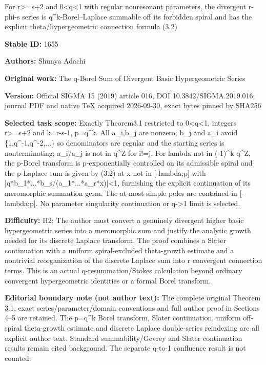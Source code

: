 \documentclass[11pt]{article}
\numberwithin{equation}{section}
\begin{document}
\begin{center}\Large For r>=s+2 and 0<q<1 with regular nonresonant parameters, the divergent r-phi-s series is q\textasciicircum{}k-Borel–Laplace summable off its forbidden spiral and has the explicit theta/hypergeometric connection formula (3.2)\end{center}
\noindent\textbf{Stable ID:} 1655\par
\noindent\textbf{Authors:} Shunya Adachi\par
\noindent\textbf{Original work:} The q-Borel Sum of Divergent Basic Hypergeometric Series\par
\noindent\textbf{Version:} Official SIGMA 15 (2019) article 016, DOI 10.3842/SIGMA.2019.016; journal PDF and native TeX acquired 2026-09-30, exact bytes pinned by SHA256\par
\noindent\textbf{Selected task scope:} Exactly Theorem3.1 restricted to 0<q<1, integers r>=s+2 and k=r-s-1, p=q\textasciicircum{}k. All a\_i,b\_j are nonzero; b\_j and a\_i avoid \{1,q\textasciicircum{}-1,q\textasciicircum{}-2,...\} so denominators are regular and the starting series is nonterminating; a\_i/a\_j is not in q\textasciicircum{}Z for i!=j. For lambda not in (-1)\textasciicircum{}k q\textasciicircum{}Z, the p-Borel transform is p-exponentially controlled on its admissible spiral and the p-Laplace sum is given by (3.2) at x not in [-lambda;p] with |q*b\_1*...*b\_s/(a\_1*...*a\_r*x)|<1, furnishing the explicit continuation of its meromorphic summation germ. The at-most-simple poles are contained in [-lambda;p]. No parameter singularity continuation or q->1 limit is selected.\par
\noindent\textbf{Difficulty:} H2: The author must convert a genuinely divergent higher basic hypergeometric series into a meromorphic sum and justify the analytic growth needed for its discrete Laplace transform. The proof combines a Slater continuation with a uniform spiral-excluded theta-growth estimate and a nontrivial reorganization of the discrete Laplace sum into r convergent connection terms. This is an actual q-resummation/Stokes calculation beyond ordinary convergent hypergeometric identities or a formal Borel transform.\par
\noindent\textbf{Editorial boundary note (not author text):} The complete original Theorem 3.1, exact series/parameter/domain conventions and full author proof in Sections 4–5 are retained. The p=q\textasciicircum{}k Borel transform, Slater continuation, uniform off-spiral theta-growth estimate and discrete Laplace double-series reindexing are all explicit author text. Standard summability/Gevrey and Slater continuation results remain cited background. The separate q-to-1 confluence result is not counted.\par
\end{document}
